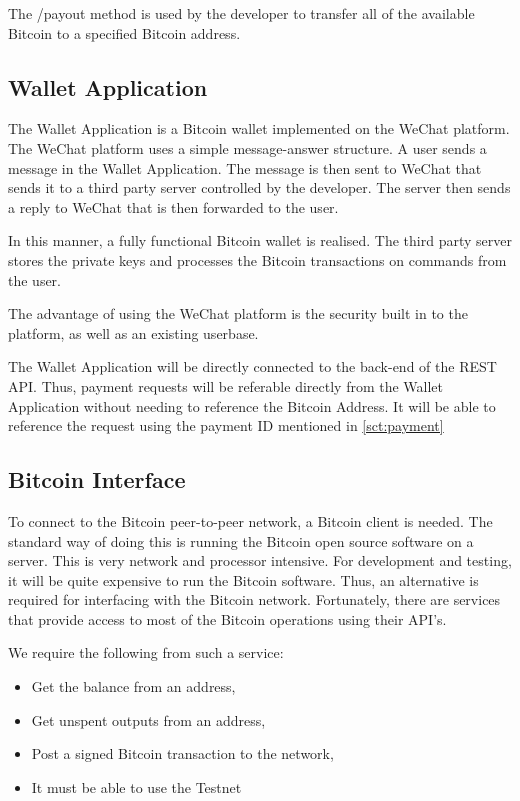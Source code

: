 The /payout method is used by the developer to transfer all of the available Bitcoin to a specified Bitcoin address.

\subsection{Wallet Application}

The Wallet Application is a Bitcoin wallet implemented on the WeChat platform. The WeChat platform uses a simple message-answer structure. A user sends a message in the Wallet Application. The message is then sent to WeChat that sends it to a third party server controlled by the developer. The server then sends a reply to WeChat that is then forwarded to the user. 

In this manner, a fully functional Bitcoin wallet is realised. The third party server stores the private keys and processes the Bitcoin transactions on commands from the user.

The advantage of using the WeChat platform is the security built in to the platform, as well as an existing userbase. 

The Wallet Application will be directly connected to the back-end of the REST API. Thus, payment requests will be referable directly from the Wallet Application without needing to reference the Bitcoin Address. It will be able to reference the request using the payment ID mentioned in \ref{sct:payment}

\subsection{Bitcoin Interface}

To connect to the Bitcoin peer-to-peer network, a Bitcoin client is needed. The standard way of doing this is running the Bitcoin open source software on a server. This is very network and processor intensive. For development and testing, it will be quite expensive to run the Bitcoin software. Thus, an alternative is required for interfacing with the Bitcoin network. Fortunately, there are services that provide access to most of the Bitcoin operations using their API's. 

We require the following from such a service:

\begin{itemize}
	\item Get the balance from an address,
	\item Get unspent outputs from an address,
	\item Post a signed Bitcoin transaction to the network,
	\item It must be able to use the Testnet
\end{itemize}

